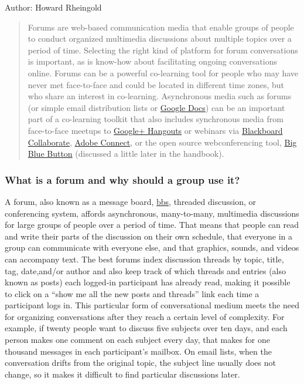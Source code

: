 Author: Howard Rheingold

\begin{quote}
Forums are web-based communication media that enable groups of people to
conduct organized multimedia discussions about multiple topics over a
period of time. Selecting the right kind of platform for forum
conversations is important, as is know-how about facilitating ongoing
conversations online. Forums can be a powerful co-learning tool for
people who may have never met face-to-face and could be located in
different time zones, but who share an interest in co-learning.
Asynchronous media such as forums (or simple email distribution lists or
\href{http://www.youtube.com/watch?v=VVFbqHhkb-k}{Google Docs}) can be
an important part of a co-learning toolkit that also includes synchronous
media from face-to-face meetups to
\href{http://www.google.com/+/learnmore/hangouts/}{Google+ Hangouts} or
webinars via
\href{http://www.blackboard.com/Platforms/Collaborate/Products/Blackboard-Collaborate.aspx}{Blackboard
Collaborate},
\href{http://www.adobe.com/products/adobeconnect.html}{Adobe Connect},
or the open source webconferencing tool,
\href{http://www.bigbluebutton.org/}{Big Blue Button} (discussed a little
later in the handbook).
\end{quote}

\subsubsection{What is a forum and why should a group use it?}

A forum, also known as a message board,
\href{http://en.wikipedia.org/wiki/Bulletin\_board\_system}{bbs},
threaded discussion, or conferencing system, affords asynchronous,
many-to-many, multimedia discussions for large groups of people over a
period of time. That means that people can read and write their parts of
the discussion on their own schedule, that everyone in a group can
communicate with everyone else, and that graphics, sounds, and videos
can accompany text. The best forums index discussion threads by topic,
title, tag, date,and/or author and also keep track of which threads and
entries (also known as posts) each logged-in participant has already
read, making it possible to click on a ``show me all the new posts and
threads'' link each time a participant logs in. This particular form of
conversational medium meets the need for organizing conversations after
they reach a certain level of complexity. For example, if twenty people
want to discuss five subjects over ten days, and each person makes one
comment on each subject every day, that makes for one thousand messages
in each participant's mailbox. On email lists, when the conversation
drifts from the original topic, the subject line usually does not
change, so it makes it difficult to find particular discussions later.

